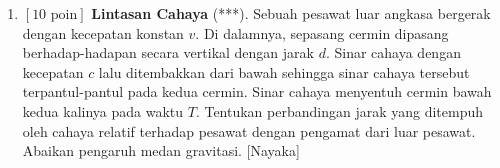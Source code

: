 \documentclass[12pt, a4paper]{article}\usepackage[utf8]{inputenc}
\theoremstyle{definition}
\theoremstyle{definition}
\begin{document}
\begin{enumerate}
\begin{center}
			\end{center}
			
			
			\item $\left[\text{10 poin}\right]$ \textbf{Lintasan Cahaya} (***). Sebuah pesawat luar angkasa bergerak dengan kecepatan konstan $v$. Di dalamnya, sepasang cermin dipasang berhadap-hadapan secara vertikal dengan jarak $d$. Sinar cahaya dengan kecepatan $c$ lalu ditembakkan dari bawah sehingga sinar cahaya tersebut terpantul-pantul pada kedua cermin. Sinar cahaya menyentuh cermin bawah kedua kalinya pada waktu $T$. Tentukan perbandingan jarak yang ditempuh oleh cahaya relatif terhadap pesawat dengan pengamat dari luar pesawat. Abaikan pengaruh medan gravitasi. [Nayaka]
			
			\begin{center}
				
				
				
				\begin{tikzpicture}[x=0.75pt,y=0.75pt,yscale=-1,xscale=1]
					

\end{tikzpicture}
\end{center}
\end{enumerate}
\end{document}
